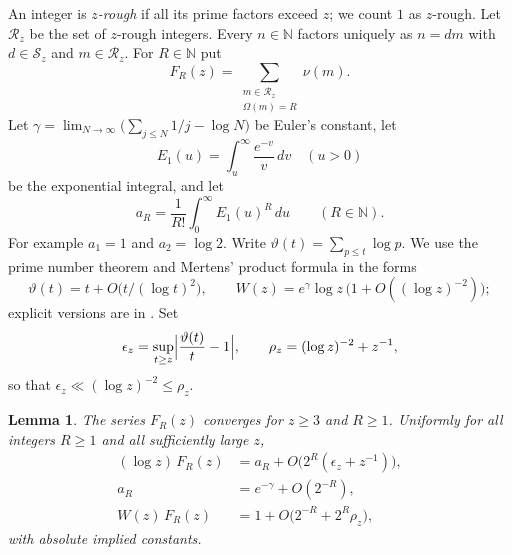 \documentclass[11pt,a4paper]{article}
\numberwithin{equation}{section}
\theoremstyle{plain}
\newtheorem{lemma}[theorem]{Lemma}
\theoremstyle{definition}
\theoremstyle{remark}
\newcommand{\N}{\mathbb{N}}
\newcommand{\cS}{\mathcal{S}}
\newcommand{\cR}{\mathcal{R}}
\begin{document}
An integer is \emph{$z$-rough} if all its prime factors exceed $z$; we count $1$ as $z$-rough. Let $\cR_z$ be the set of $z$-rough integers. Every $n\in\N$ factors uniquely as $n=dm$ with $d\in\cS_z$ and $m\in\cR_z$. For $R\in\N$ put
\[
F_R(z)=\sum_{\substack{m\in\cR_z\\ \Omega(m)=R}}\nu(m).
\]
Let $\gamma=\lim_{N\to\infty}\bigl(\sum_{j\le N}1/j-\log N\bigr)$ be Euler's constant, let
\[
E_1(u)=\int_u^\infty\frac{e^{-v}}{v}\,dv\quad(u>0)
\]
be the exponential integral, and let
\[
a_R=\frac1{R!}\int_0^\infty E_1(u)^R\,du\qquad(R\in\N).
\]
For example $a_1=1$ and $a_2=\log2$. Write $\vartheta(t)=\sum_{p\le t}\log p$. We use the prime number theorem and Mertens' product formula in the forms
\begin{equation}\label{eq:primes}
\vartheta(t)=t+O\bigl(t/(\log t)^2\bigr),\qquad W(z)=e^\gamma\log z\,\bigl(1+O((\log z)^{-2})\bigr);
\end{equation}
explicit versions are in \cite[Theorems~5.2 and~6.12]{Dusart}. Set
\[
\epsilon_z=\sup_{t\ge z}\Bigl|\frac{\vartheta(t)}{t}-1\Bigr|,\qquad \rho_z=(\log z)^{-2}+z^{-1},
\]
so that $\epsilon_z\ll(\log z)^{-2}\le\rho_z$.

\begin{lemma}\label{lem:FR}
The series $F_R(z)$ converges for $z\ge3$ and $R\ge1$. Uniformly for all integers $R\ge1$ and all sufficiently large $z$,
\begin{align}
(\log z)\,F_R(z)&=a_R+O\bigl(2^R(\epsilon_z+z^{-1})\bigr),\label{eq:FRa}\\
a_R&=e^{-\gamma}+O(2^{-R}),\label{eq:aR}\\
W(z)\,F_R(z)&=1+O\bigl(2^{-R}+2^R\rho_z\bigr),\label{eq:WF}
\end{align}
with absolute implied constants.
\end{lemma}
\end{document}
